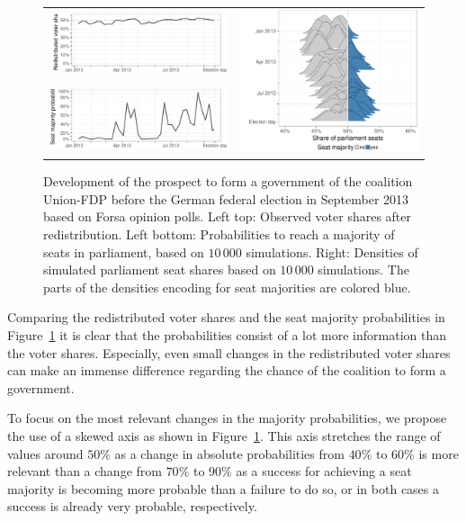 \documentclass[smallcondensed]{svjour3}     %
\begin{document}
\begin{figure}[H]\centering
\begin{tabular}{ll}
\includegraphics[height=.15\textwidth]{figures/2013_forsa_cdufdp_rawSharesRedist.pdf}
&
\multirow{2}{*}[13ex]{\includegraphics[height=30ex]{figures/2013_forsa_cdufdp_ridgeline.pdf}}
\\
\includegraphics[height=.15\textwidth]{figures/2013_forsa_cdufdp_prob.pdf}
\end{tabular}
\caption{Development of the prospect to form a government of the coalition Union-FDP before the German federal election in September 2013 based on Forsa opinion polls.
Left top: Observed voter shares after redistribution. Left bottom: Probabilities to reach a majority of seats in parliament, based on $10\,000$ simulations. Right: Densities of simulated parliament seat shares based on $10\,000$ simulations. The parts of the densities encoding for seat majorities are colored blue.
\label{fig:seatDist_time}
}
\end{figure}

Comparing the redistributed voter shares and the seat majority probabilities
in Figure~\ref{fig:seatDist_time} it is clear that the probabilities consist
of a lot more information than the voter shares. Especially, even small changes
in the redistributed voter shares can make an immense difference regarding the
chance of the coalition to form a government.

To focus on the most relevant changes in the majority probabilities, we propose
the use of a skewed axis as shown in Figure~\ref{fig:seatDist_time}. This axis
stretches the range of values around $50\%$ as a change in absolute probabilities
from $40\%$ to $60\%$ is more relevant than a change from $70\%$ to $90\%$ as
a success for achieving a seat majority is becoming more probable than a failure
to do so, or in both cases a success is already very probable, respectively.
\end{document}

